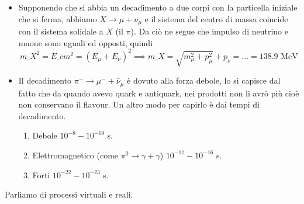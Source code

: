 \begin{itemize}
    \item Supponendo che si abbia un decadimento a due corpi con la particella iniziale che si ferma, abbiamo $X\to\mu+\nu_\mu$ e il sistema del centro di massa coincide con il sistema solidale a $X$ (il $\pi$). Da ciò ne segue che impulso di neutrino e muone sono uguali ed opposti, quindi  
    \begin{equation*}
    m\_X^2=E\_{cm}^2=(E_\mu+E_\nu)^2\implies m\_X=\sqrt{m_\mu^2+p_\mu^2}+p_\nu=\dots=138.9 \text{ MeV}
    \end{equation*}
    \item Il decadimento $\pi^-\to\mu^-+\bar\nu_\mu$ è dovuto alla forza debole, lo si capisce dal fatto che da quando avevo quark e antiquark, nei prodotti non li avrò più cioè non conservano il flavour. Un altro modo per capirlo è dai tempi di decadimento. 
    \begin{enumerate}
        \item Debole $10^{-8}-10^{-10}$ s.
        \item Elettromagnetico (come $\pi^0\to \gamma+\gamma$) $10^{-17}-10^{-16}$ s.
        \item Forti $10^{-22}-10^{-23}$ s.
    \end{enumerate}
\end{itemize}
Parliamo di processi virtuali e reali. 
